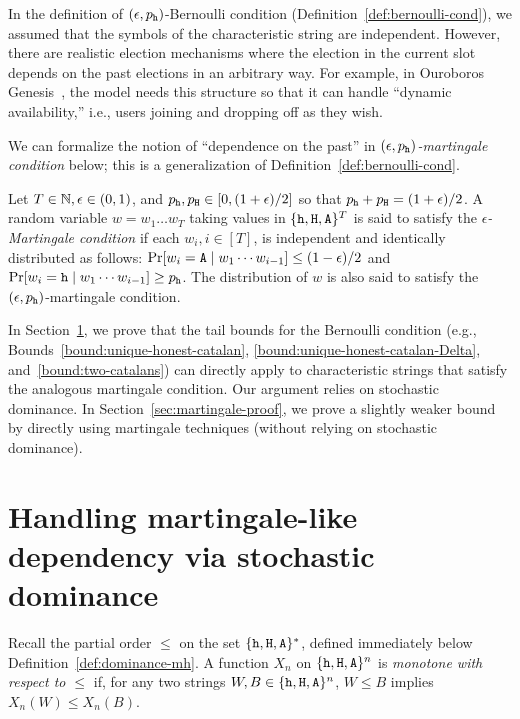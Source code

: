 In the definition of $(\epsilon, p_{\mathtt{h}})$-Bernoulli condition (Definition~\ref{def:bernoulli-cond}), 
we assumed that the symbols of the characteristic string are independent. 
However, there are realistic election mechanisms where 
the election in the current slot depends on the past elections in an arbitrary way. 
For example, in Ouroboros Genesis~\cite{Genesis}, the model needs this structure 
so that it can handle ``dynamic availability,'' i.e., users joining and dropping off as they wish.

We can formalize the notion of ``dependence on the past'' 
in \emph{$(\epsilon, p_{\mathtt{h}})$-martingale condition} below;
this is a generalization of Definition~\ref{def:bernoulli-cond}. 


\begin{definition}\label{def:martingale-cond}
  Let $T \in \mathbb{N}, \epsilon \in (0,1)$, and $p_{\mathtt{h}}, p_{\mathtt{H}} \in  [0, (1+\epsilon)/2]$ so that 
  $p_{\mathtt{h}} + p_{\mathtt{H}} = (1+\epsilon)/2$. A random variable $w = w_1 \ldots w_T$
  taking values in $\{\mathtt{h}, \mathtt{H}, \mathtt{A}\}^T$ is said to satisfy the
  \emph{$\epsilon$-Martingale condition} if each
  $w_i, i \in [T]$, is independent and identically distributed as
  follows: 
  $\Pr[w_i = \mathtt{A} \mid w_1 \cdots w_{i-1}] \leq (1-\epsilon)/2$ and 
  $\Pr[w_i = \mathtt{h} \mid w_1 \cdots w_{i-1}] \geq p_{\mathtt{h}}$.
  The distribution of $w$ is also said
  to satisfy the $(\epsilon, p_{\mathtt{h}})$-martingale condition.
\end{definition}


In Section~\ref{sec:martingale-dominance}, we prove that the tail bounds 
for the Bernoulli condition 
(e.g., Bounds~\ref{bound:unique-honest-catalan},
\ref{bound:unique-honest-catalan-Delta}, 
and~\ref{bound:two-catalans})
can directly apply to characteristic strings that satisfy the analogous martingale condition. 
Our argument relies on stochastic dominance.
In Section~\ref{sec:martingale-proof}, 
we prove a slightly weaker bound 
by directly using martingale techniques (without relying on stochastic dominance). 



\section{Handling martingale-like dependency via stochastic dominance}\label{sec:martingale-dominance}


  
  Recall the partial order $\leq$ on the set $\{\mathtt{h}, \mathtt{H}, \mathtt{A}\}^*$, 
  defined immediately below Definition~\ref{def:dominance-mh}.
  A function $X_n$ on $\{\mathtt{h}, \mathtt{H}, \mathtt{A}\}^n$ is \emph{monotone with respect to $\leq$} 
  if, for any two strings $W, B \in \{\mathtt{h}, \mathtt{H}, \mathtt{A}\}^n$, $W \leq B$ implies $X_n(W) \leq X_n(B)$. 

